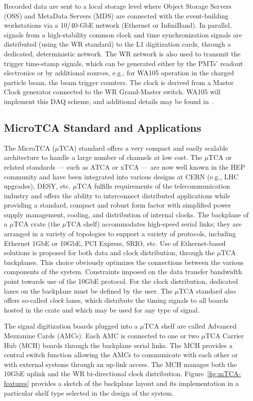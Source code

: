 Recorded data are sent to a local storage level where Object Storage
Servers (OSS) and MetaData Servers (MDS) are connected with the 
event-building workstations via a 10/40-GbE network (Ethernet or
InfiniBand). In parallel, signals from a high-stability common clock and time
synchronization signals are distributed (using the WR standard) 
to the L1 digitization cards, through a dedicated, deterministic
network. The WR network is also used to transmit the trigger time-stamp signals,
which can be generated either by the PMTs' readout electronics or by
additional sources, e.g., for WA105 operation in the charged particle beam, 
the beam trigger counters. The clock is derived
from a Master Clock generator connected to the WR
Grand-Master switch. WA105 will implement this DAQ scheme, and 
additional details may be found in~\cite{WA105_TDR}.


\subsection{MicroTCA Standard and Applications}

The MicroTCA ($\mu$TCA) standard offers a very compact and easily scalable
architecture to handle a large number of channels at low cost. The
$\mu$TCA or related standards --- such as ATCA or xTCA --- are now
well known in the HEP community and have been integrated into various
designs at CERN (e.g., LHC upgrades), DESY, etc.  $\mu$TCA fulfills
requirements of the telecommunication industry and offers the
ability to interconnect distributed applications while providing a
standard, compact and robust form factor with simplified power supply
management, cooling, and distribution of internal clocks. The backplane of
a $\mu$TCA crate (the $\mu$TCA shelf) accommodates high-speed
serial links; they are arranged in a variety of topologies to support a 
variety of protocols, including Ethernet 1GbE or 10GbE, PCI Express, SRIO,
etc. Use of Ethernet-based solutions is proposed for both data
and clock distribution, through the $\mu$TCA backplanes. This choice
obviously optimizes the connections between the various components of the system.
 Constraints imposed on the data transfer bandwidth point towards use of 
the 10GbE protocol. For the
clock distribution, dedicated lanes on the backplane must be defined by the user. The $\mu$TCA
standard also offers so-called \textit{clock} lanes, which distribute the timing signals to all boards
hosted in the crate and which may be used for any type of signal.

The signal digitization boards plugged into a $\mu$TCA shelf are
called Advanced Mezzanine Cards (AMCs)\cite{picmg-2006}. Each AMC
is connected to one or two $\mu$TCA Carrier Hub (MCH) boards through
the backplane serial links. The MCH provides a central switch function
allowing the AMCs to communicate with each other or with external
systems through an up-link access. The MCH manages both the 10GbE
uplink and the WR bi-directional clock
distribution. Figure~\ref{fig:mTCA-features} provides a sketch of the
backplane layout and its implementation in a particular shelf type selected in the design of the system.

